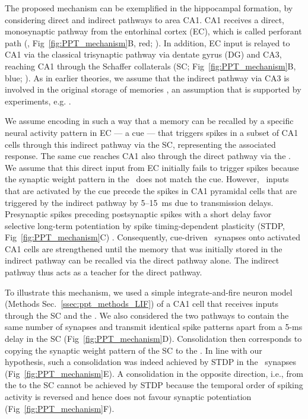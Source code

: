 The proposed mechanism can be exemplified in the hippocampal formation, by considering direct and indirect pathways to area CA1. CA1 receives a direct, monosynaptic pathway from the entorhinal cortex (EC), which is called perforant path (\ppca, Fig~\ref{fig:PPT_mechanism}B, red; \cite{Amaral1993}). In addition, EC input is relayed to CA1 via the classical trisynaptic pathway via dentate gyrus (DG) and CA3, reaching CA1 through the Schaffer collaterals (SC; Fig~\ref{fig:PPT_mechanism}B, blue; \cite{Amaral1993}). As in earlier theories, we assume that the indirect pathway via CA3 is involved in the original storage of memories \cite{Marr1969, Treves1994}, an assumption that is supported by experiments, e.g. \cite{Brun2002, Nakazawa2003, Nakashiba2008}.


We assume encoding in such a way that a memory can be recalled by a specific neural activity pattern in EC --- a cue --- that triggers spikes in a subset of CA1 cells through this indirect pathway via the SC, representing the associated response.
The same cue reaches CA1 also through the  direct pathway via the \ppca.
We assume that this direct input from EC initially fails to trigger spikes because the synaptic weight pattern in the \ppca~does not match the cue.
However, \ppca~inputs that are activated by the cue precede the spikes in CA1 pyramidal cells that are triggered by the indirect pathway by 5--15~ms \cite{Yeckel1990} due to transmission delays. Presynaptic spikes preceding postsynaptic spikes with a short delay favor selective long-term potentiation by spike timing-dependent plasticity (STDP, Fig~\ref{fig:PPT_mechanism}C) \cite{Bi1998, Markram1997, Gerstner1996}.
Consequently, cue-driven \ppca~synapses onto activated CA1 cells are strengthened until the memory that was initially stored in the indirect pathway can be recalled via the direct pathway alone. The indirect pathway thus acts as a teacher for the direct pathway.


To illustrate this mechanism, we used a simple integrate-and-fire neuron model (Methods Sec.~\ref{ssec:ppt_methods_LIF}) of a CA1 cell that receives inputs through the SC and the \ppca.
We also considered the two pathways to contain the same number of synapses and transmit identical spike patterns apart from a 5-ms delay in the SC (Fig~\ref{fig:PPT_mechanism}D).
Consolidation then corresponds to copying the synaptic weight pattern of the SC to the \ppca.
In line with our hypothesis, such a consolidation was indeed achieved by STDP in the \ppca~synapses (Fig~\ref{fig:PPT_mechanism}E). A consolidation in the opposite direction, i.e., from the \ppca to the SC cannot be achieved by STDP because the temporal order of spiking activity is reversed and hence does not favour synaptic potentiation (Fig~\ref{fig:PPT_mechanism}F).


